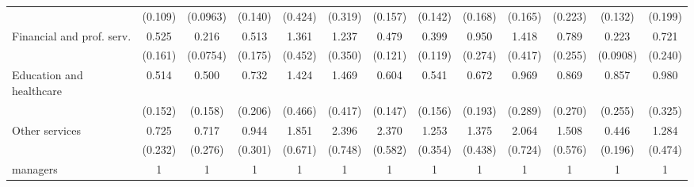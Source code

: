 {\begin{tabular}{l*{12}{c}}
                    &     (0.109)         &    (0.0963)         &     (0.140)         &     (0.424)         &     (0.319)         &     (0.157)         &     (0.142)         &     (0.168)         &     (0.165)         &     (0.223)         &     (0.132)         &     (0.199)         \\
[1em]
Financial and prof. serv.&       0.525\sym{*}  &       0.216\sym{***}&       0.513\sym{*}  &       1.361         &       1.237         &       0.479\sym{**} &       0.399\sym{**} &       0.950         &       1.418         &       0.789         &       0.223\sym{***}&       0.721         \\
                    &     (0.161)         &    (0.0754)         &     (0.175)         &     (0.452)         &     (0.350)         &     (0.121)         &     (0.119)         &     (0.274)         &     (0.417)         &     (0.255)         &    (0.0908)         &     (0.240)         \\
[1em]
Education and healthcare&       0.514\sym{*}  &       0.500\sym{*}  &       0.732         &       1.424         &       1.469         &       0.604\sym{*}  &       0.541\sym{*}  &       0.672         &       0.969         &       0.869         &       0.857         &       0.980         \\
                    &     (0.152)         &     (0.158)         &     (0.206)         &     (0.466)         &     (0.417)         &     (0.147)         &     (0.156)         &     (0.193)         &     (0.289)         &     (0.270)         &     (0.255)         &     (0.325)         \\
[1em]
Other services      &       0.725         &       0.717         &       0.944         &       1.851         &       2.396\sym{**} &       2.370\sym{***}&       1.253         &       1.375         &       2.064\sym{*}  &       1.508         &       0.446         &       1.284         \\
                    &     (0.232)         &     (0.276)         &     (0.301)         &     (0.671)         &     (0.748)         &     (0.582)         &     (0.354)         &     (0.438)         &     (0.724)         &     (0.576)         &     (0.196)         &     (0.474)         \\
[1em]
managers            &           1         &           1         &           1         &           1         &           1         &           1         &           1         &           1         &           1         &           1         &           1         &           1         \\

\end{tabular}}
